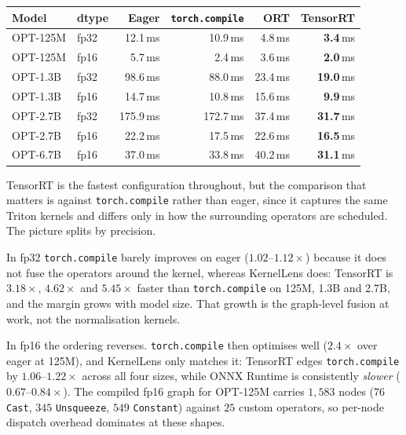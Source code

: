 \documentclass[11pt,a4paper]{article}
\begin{document}
\begin{center}
\footnotesize
\begin{tabular}{llrrrr}
\toprule
Model & dtype & Eager & \texttt{torch.compile} & ORT & TensorRT \\
\midrule
OPT-125M & fp32 & 12.1\,ms & 10.9\,ms & 4.8\,ms & \textbf{3.4}\,ms \\
OPT-125M & fp16 & 5.7\,ms & 2.4\,ms & 3.6\,ms & \textbf{2.0}\,ms \\
OPT-1.3B & fp32 & 98.6\,ms & 88.0\,ms & 23.4\,ms & \textbf{19.0}\,ms \\
OPT-1.3B & fp16 & 14.7\,ms & 10.8\,ms & 15.6\,ms & \textbf{9.9}\,ms \\
OPT-2.7B & fp32 & 175.9\,ms & 172.7\,ms & 37.4\,ms & \textbf{31.7}\,ms \\
OPT-2.7B & fp16 & 22.2\,ms & 17.5\,ms & 22.6\,ms & \textbf{16.5}\,ms \\
OPT-6.7B & fp16 & 37.0\,ms & 33.8\,ms & 40.2\,ms & \textbf{31.1}\,ms \\
\bottomrule
\end{tabular}
\label{tab:real}
\end{center}

TensorRT is the fastest configuration throughout, but the comparison that
matters is against \texttt{torch.compile} rather than eager, since it captures
the same Triton kernels and differs only in how the surrounding operators are
scheduled. The picture splits by precision.

In fp32 \texttt{torch.compile} barely improves on eager ($1.02$--$1.12\times$)
because it does not fuse the operators around the kernel, whereas KernelLens
does: TensorRT is $3.18\times$, $4.62\times$ and $5.45\times$ faster than
\texttt{torch.compile} on 125M, 1.3B and 2.7B, and the margin grows with model
size. That growth is the graph-level fusion at work, not the normalisation
kernels.

In fp16 the ordering reverses. \texttt{torch.compile} then optimises well
($2.4\times$ over eager at 125M), and KernelLens only matches it: TensorRT
edges \texttt{torch.compile} by $1.06$--$1.22\times$ across all four sizes,
while ONNX Runtime is consistently \emph{slower} ($0.67$--$0.84\times$). The
compiled fp16 graph for OPT-125M carries $1{,}583$ nodes ($76$ \texttt{Cast},
$345$ \texttt{Unsqueeze}, $549$ \texttt{Constant}) against $25$ custom
operators, so per-node dispatch overhead dominates at these shapes.
\end{document}
